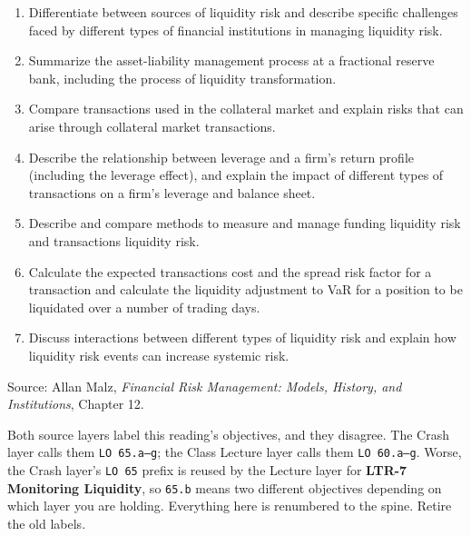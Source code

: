 
\begin{lrkeybox}
\begin{enumerate}[label=\textbf{\alph*.}]
\item Differentiate between sources of liquidity risk and describe specific challenges faced by different types of financial institutions in managing liquidity risk.
\item Summarize the asset-liability management process at a fractional reserve bank, including the process of liquidity transformation.
\item Compare transactions used in the collateral market and explain risks that can arise through collateral market transactions.
\item Describe the relationship between leverage and a firm's return profile (including the leverage effect), and explain the impact of different types of transactions on a firm's leverage and balance sheet.
\item Describe and compare methods to measure and manage funding liquidity risk and transactions liquidity risk.
\item Calculate the expected transactions cost and the spread risk factor for a transaction and calculate the liquidity adjustment to VaR for a position to be liquidated over a number of trading days.
\item Discuss interactions between different types of liquidity risk and explain how liquidity risk events can increase systemic risk.
\end{enumerate}
{\footnotesize\color{FRMGrey}Source: Allan Malz, \textit{Financial Risk Management: Models, History, and Institutions}, Chapter 12.}
\end{lrkeybox}

\begin{lrtrapbox}
Both source layers label this reading's objectives, and they disagree. The Crash layer calls them \texttt{LO 65.a--g}; the Class Lecture layer calls them \texttt{LO 60.a--g}. Worse, the Crash layer's \texttt{LO 65} prefix is reused by the Lecture layer for \textbf{LTR-7 Monitoring Liquidity}, so \texttt{65.b} means two different objectives depending on which layer you are holding. Everything here is renumbered to the spine. Retire the old labels.
\end{lrtrapbox}


